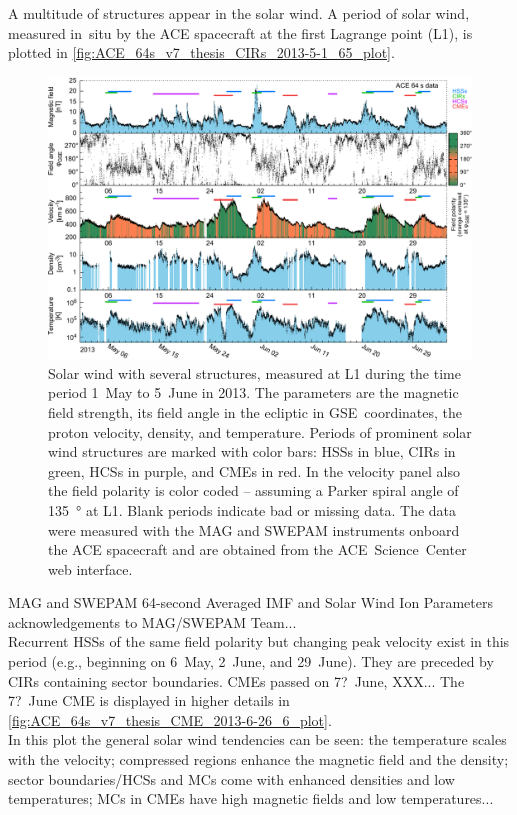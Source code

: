 A multitude of structures appear in the solar wind. A period of solar wind, measured in~situ by the ACE spacecraft at the first Lagrange point 
(L1), is plotted in \autoref{fig:ACE_64s_v7_thesis_CIRs_2013-5-1_65_plot}.\\
\begin{figure}[htb]
	\centering
	\includegraphics[width=\textwidth]{images/gnuplots/ACE_64s_v7_thesis_CIRs_2013-5-1_65_plot.pdf}
	\caption{Solar wind with several structures, measured at L1 during the time period 1~May to 5~June in 2013. The parameters are the magnetic field strength, its field angle in the ecliptic in GSE~coordinates, the proton velocity, density, and temperature. Periods of prominent solar wind structures are marked with color bars: HSSs in blue, CIRs in green, HCSs in purple, and CMEs in red. In the velocity panel also the field polarity is color coded -- assuming a Parker spiral angle of \SI{135}{\degree} at L1. Blank periods indicate bad or missing data. The data were measured with the MAG and SWEPAM instruments onboard the ACE spacecraft and are obtained from the ACE~Science~Center web interface\protect\footnotemark.}
	\label{fig:ACE_64s_v7_thesis_CIRs_2013-5-1_65_plot}
\end{figure}
MAG and SWEPAM 64-second Averaged IMF and Solar Wind Ion Parameters\\
acknowledgements to MAG/SWEPAM Team...\\

Recurrent HSSs of the same field polarity but changing peak velocity exist in this period (e.g., beginning on 6~May, 2~June, and 29~June). They are preceded by CIRs containing sector boundaries. CMEs passed on 7?~June, XXX... The 7?~June CME is displayed in higher details in \autoref{fig:ACE_64s_v7_thesis_CME_2013-6-26_6_plot}.\\
In this plot the general solar wind tendencies can be seen: the temperature scales with the velocity; compressed regions enhance the magnetic field and the density; sector boundaries/HCSs and MCs come with enhanced densities and low temperatures; MCs in CMEs have high magnetic fields and low temperatures...\\



